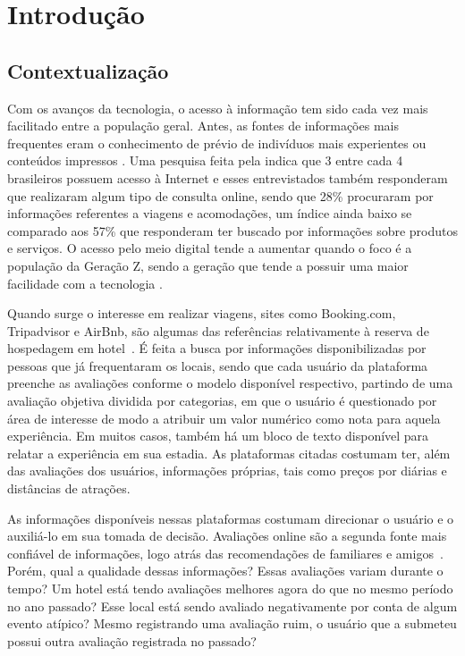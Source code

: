 
\chapter[Introdução]{Introdução}
\label{cap:intro}

\section{Contextualização}

Com os avanços da tecnologia, o acesso à informação tem sido cada vez mais facilitado entre a população geral. Antes, as fontes de informações mais frequentes eram o conhecimento de prévio de indivíduos mais experientes ou conteúdos impressos \cite{jayathilake2021critical}. Uma pesquisa feita pela  indica que 3 entre cada 4 brasileiros possuem acesso à Internet e esses entrevistados também responderam que realizaram algum tipo de consulta online, sendo que 28\% procuraram por informações referentes a viagens e acomodações, um índice ainda baixo se comparado aos 57\% que responderam ter buscado por informações sobre produtos e serviços. O acesso pelo meio digital tende a aumentar quando o foco é a população da Geração Z, sendo a geração que tende a possuir uma maior facilidade com a tecnologia \cite{sfodera2022technology}.

Quando surge o interesse em realizar viagens, sites como Booking.com, Tripadvisor e AirBnb, são algumas das referências relativamente à reserva de hospedagem em hotel~\cite{best2022HostSites}. É feita a busca por informações disponibilizadas por pessoas que já frequentaram os locais, sendo que cada usuário da plataforma preenche as avaliações conforme o modelo disponível respectivo, partindo de uma avaliação objetiva dividida por categorias, em que o usuário é questionado por área de interesse de modo a atribuir um valor numérico como nota para aquela experiência. Em muitos casos, também há um bloco de texto disponível para relatar a experiência em sua estadia. As plataformas citadas costumam ter, além das avaliações dos usuários, informações próprias, tais como preços por diárias e distâncias de atrações.

As informações disponíveis nessas plataformas costumam direcionar o usuário e o auxiliá-lo em sua tomada de decisão. Avaliações online são a segunda fonte mais confiável de informações, logo atrás das recomendações de familiares e amigos~\cite{chatterjee2020drivers}. Porém, qual a qualidade dessas informações? Essas avaliações variam durante o tempo? Um hotel está tendo avaliações melhores agora do que no mesmo período no ano passado? Esse local está sendo avaliado negativamente por conta de algum evento atípico? Mesmo registrando uma avaliação ruim, o usuário que a submeteu possui outra avaliação registrada no passado?

